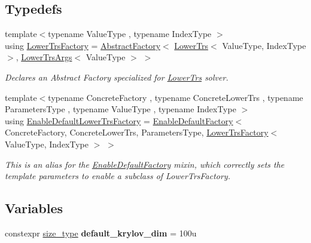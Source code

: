 \subsection*{Typedefs}
\begin{DoxyCompactItemize}
\item 
{\footnotesize template$<$typename Value\+Type , typename Index\+Type $>$ }\\using \hyperlink{namespacegko_1_1solver_a33146299540a54a9a39ec127fc8c6c1a}{Lower\+Trs\+Factory} = \hyperlink{classgko_1_1AbstractFactory}{Abstract\+Factory}$<$ \hyperlink{classgko_1_1solver_1_1LowerTrs}{Lower\+Trs}$<$ Value\+Type, Index\+Type $>$, \hyperlink{structgko_1_1solver_1_1LowerTrsArgs}{Lower\+Trs\+Args}$<$ Value\+Type $>$ $>$
\begin{DoxyCompactList}\small\item\em Declares an Abstract Factory specialized for \hyperlink{classgko_1_1solver_1_1LowerTrs}{Lower\+Trs} solver. \end{DoxyCompactList}\item 
{\footnotesize template$<$typename Concrete\+Factory , typename Concrete\+Lower\+Trs , typename Parameters\+Type , typename Value\+Type , typename Index\+Type $>$ }\\using \hyperlink{namespacegko_1_1solver_a6ff1e5ae2e801957e4055be113328f67}{Enable\+Default\+Lower\+Trs\+Factory} = \hyperlink{classgko_1_1EnableDefaultFactory}{Enable\+Default\+Factory}$<$ Concrete\+Factory, Concrete\+Lower\+Trs, Parameters\+Type, \hyperlink{namespacegko_1_1solver_a33146299540a54a9a39ec127fc8c6c1a}{Lower\+Trs\+Factory}$<$ Value\+Type, Index\+Type $>$ $>$
\begin{DoxyCompactList}\small\item\em This is an alias for the \hyperlink{classgko_1_1EnableDefaultFactory}{Enable\+Default\+Factory} mixin, which correctly sets the template parameters to enable a subclass of Lower\+Trs\+Factory. \end{DoxyCompactList}\end{DoxyCompactItemize}
\subsection*{Variables}
\begin{DoxyCompactItemize}
\item 
\mbox{\label{namespacegko_1_1solver_a39b458ab377c785ee54f5e4cbe7ab1a6}} 
constexpr \hyperlink{namespacegko_a6e5c95df0ae4e47aab2f604a22d98ee7}{size\+\_\+type} {\bfseries default\+\_\+krylov\+\_\+dim} = 100u
\end{DoxyCompactItemize}


